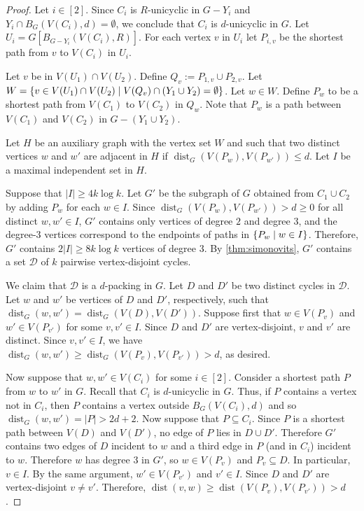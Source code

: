 \documentclass{patmorin}
\DeclareMathOperator{\dist}{dist}
\DeclarePairedDelimiter\set{\{}{\}}
\begin{document}
\begin{proof}
    Let $i\in[2]$.
    Since $C_i$ is $R$-unicyclic in $G-Y_i$ and $Y_i\cap B_G(V(C_i),d) = \emptyset$, we conclude that $C_i$ is $d$-unicyclic in $G$.
    Let $U_i = G[B_{G-Y_i}(V(C_i),R)]$.
    For each vertex $v$ in $U_i$ let $P_{i,v}$ be the shortest path from $v$ to $V(C_i)$ in $U_i$.

    Let $v$ be in $V(U_1)\cap V(U_2)$.
    Define $Q_v:= P_{1,v}\cup P_{2,v}$.
    Let $W=\set{v \in V(U_1)\cap V(U_2) \mid V(Q_v)\cap (Y_1\cup Y_2) =\emptyset}$.
    Let $w \in W$.
    Define $P_w$ to be a shortest path from $V(C_1)$ to $V(C_2)$ in $Q_w$.
    Note that $P_w$ is a path between $V(C_1)$ and $V(C_2)$ in $G-(Y_1\cup Y_2)$.


    Let $H$ be an auxiliary graph with the vertex set $W$ and such that two distinct vertices $w$ and $w'$ are adjacent in $H$ if $\dist_G(V(P_w),V(P_{w'}))\leq d$.
    Let $I$ be a maximal independent set in $H$.

    Suppose that $|I|\geq 4k\log k$.
    Let $G'$ be the subgraph of $G$ obtained from $C_1\cup C_2$ by adding $P_w$ for each $w\in I$.
    Since $\dist_G(V(P_w),V(P_{w'}))>d\ge0$ for all distinct $w,w'\in I$, $G'$ contains only vertices of degree $2$ and degree $3$, and the degree-$3$ vertices correspond to the endpoints of paths in $\set{P_w\mid w\in I}$.
    Therefore, $G'$ contains $2|I|\geq 8k\log k$ vertices of degree $3$.
    By \cref{thm:simonovits}, $G'$ contains a set $\mathcal{D}$ of $k$ pairwise vertex-disjoint cycles.

    We claim that $\mathcal{D}$ is a $d$-packing in $G$.
    Let $D$ and $D'$ be two distinct cycles in $\mathcal{D}$.
    Let $w$ and $w'$ be vertices of $D$ and $D'$, respectively,
    such that $\dist_G(w,w')=\dist_G(V(D),V(D'))$.
    Suppose first that $w\in V(P_v)$ and $w'\in V(P_{v'})$ for some  $v,v' \in I$.
    Since $D$ and $D'$ are vertex-disjoint, $v$ and $v'$ are distinct.
    Since $v,v'\in I$, we have $\dist_G(w,w') \geq \dist_G(V(P_v),V(P_{v'}))>d$, as desired.

    Now suppose that $w, w' \in V(C_i)$ for some $i\in[2]$.
    Consider a shortest path $P$ from $w$ to $w'$ in $G$.
    Recall that $C_i$ is $d$-unicyclic in $G$.
    Thus, if $P$ contains a vertex not in $C_i$, then $P$ contains a vertex outside $B_G(V(C_i),d)$ and so $\dist_G(w,w')=|P|>2d+2$.
    Now suppose that $P\subseteq C_i$.
    Since $P$ is a shortest path between $V(D)$ and $V(D')$, no edge of $P$ lies in $D\cup D'$.
    Therefore $G'$ contains two edges of $D$ incident to $w$ and a third edge in $P$ (and in $C_i$) incident to $w$.
    Therefore $w$ has degree $3$ in $G'$, so $w\in V(P_{v})$ and $P_v\subseteq D$.
    In particular, $v\in I$.
    By the same argument, $w'\in V(P_{v'})$ and $v'\in I$.
    Since $D$ and $D'$ are vertex-disjoint $v\neq v'$.
    Therefore, $\dist(v,w)\ge \dist(V(P_v),V(P_{v'}))>d$.



\end{proof}
\end{document}
